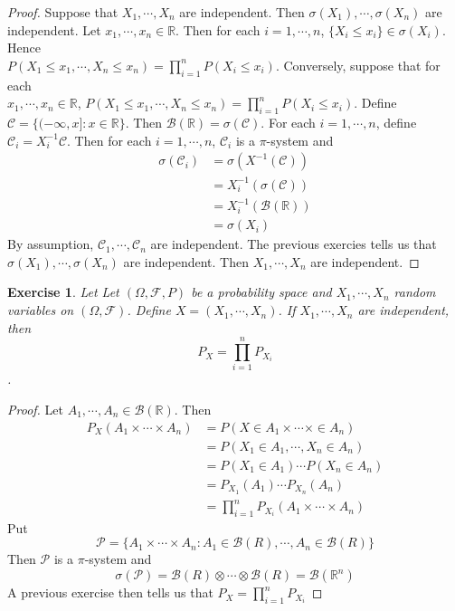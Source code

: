 \documentclass[12pt]{amsart}
\newtheorem{ex}[thm]{Exercise}
\newcommand{\sig}{\sigma}
\newcommand{\Om}{\Omega}
\newcommand{\R}{\mathbb{R}}
\newcommand{\MC}{\mathcal{C}}
\newcommand{\MB}{\mathcal{B}}
\newcommand{\MF}{\mathcal{F}}
\newcommand{\MP}{\mathcal{P}}
\begin{document}
	\begin{proof}
		Suppose that $X_1, \cdots, X_n$ are independent. Then $\sig(X_1), \cdots, \sig(X_n)$ are independent. Let $x_1, \cdots, x_n \in \R$. Then for each $i=1, \cdots, n$, $\{X_i \leq x_i\} \in \sigma(X_i)$. Hence \\$P(X_1 \leq x_1, \cdots, X_n \leq x_n ) = \prod\limits_{i=1}^nP(X_i \leq x_i)$. Conversely, suppose that for each \\$x_1, \cdots, x_n \in \R$, $P(X_1 \leq x_1, \cdots, X_n \leq x_n ) = \prod\limits_{i=1}^nP(X_i \leq x_i)$. Define $\MC = \{ (-\infty, x]: x \in \R \}$. Then $\MB(\R) = \sig(\MC)$. For each $i =1, \cdots, n$, define $\MC_i = X_i^{-1}\MC$. Then for each $i =1, \cdots, n$, $\MC_i$ is a $\pi$-system and 
		\begin{align*}
			\sig(\MC_i) 
			&= \sig(X^{-1}(\MC)) \\
			&= X_i^{-1}(\sig(\MC)) \\
			&= X_i^{-1}(\MB(\R)) \\
			&= \sig(X_i)
		\end{align*}
		By assumption, $\MC_1, \cdots, \MC_n$ are independent. The previous exercies tells us that $\sig(X_1), \cdots, \sig(X_n)$ are independent. Then $X_1, \cdots, X_n$ are independent. 
	\end{proof}
	
	\begin{ex}
		Let Let $(\Om, \MF, P)$ be a probability space and $X_1, \cdots, X_n$ random variables on $(\Om, \MF)$. Define $X = (X_1, \cdots, X_n)$. If $X_1, \cdots, X_n$ are independent, then $$P_{X} = \prod\limits_{i=1}^nP_{X_i}$$.
	\end{ex}
	
	\begin{proof}
		Let $A_1, \cdots, A_n \in \MB(\R)$. Then 
		\begin{align*}
			P_X(A_1 \times \cdots \times A_n) 
			&= P(X \in A_1 \times \cdots \times \in A_n)\\
			&= P(X_1 \in A_1, \cdots, X_n \in A_n) \\
			&= P(X_1 \in A_1) \cdots P(X_n \in A_n) \\
			&= P_{X_1}(A_1) \cdots P_{X_n}(A_n) \\
			&= \prod_{i=1}^nP_{X_i}(A_1 \times \cdots \times  A_n)
		\end{align*}
		Put $$\MP = \{ A_1 \times \cdots \times A_n: A_1 \in \MB(R), \cdots, A_n \in \MB(R) \}$$ Then $\MP$ is a $\pi$-system and $$\sig(\MP) = \MB(R) \otimes \cdots \otimes \MB(R) = \MB(\R^n)$$
		A previous exercise then tells us that $P_X = \prod\limits_{i=1}^nP_{X_i}$ 
	\end{proof}
	
\end{document}
